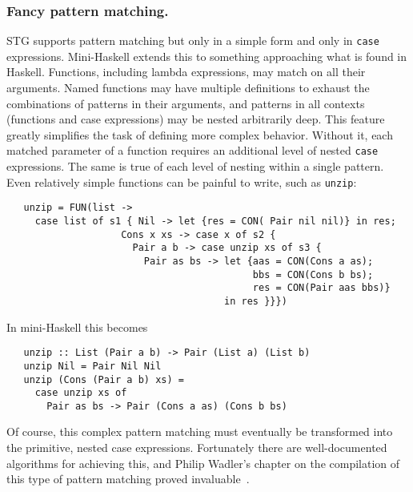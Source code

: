 \documentclass{llncs}
\begin{document}
\subsubsection{Fancy pattern matching.}

STG supports pattern matching but only in a simple form and only in
\texttt{case} expressions.  Mini-Haskell extends this to something approaching
what is found in Haskell.  Functions, including lambda expressions, may match on
all their arguments. Named functions may have multiple definitions to exhaust
the combinations of patterns in their arguments, and patterns in all contexts
(functions and case expressions) may be nested arbitrarily deep.  This feature
greatly simplifies the task of defining more complex behavior.  Without it,
each matched parameter of a function requires an additional level of nested
\texttt{case} expressions. The same is true of each level of nesting within a
single pattern.
%
Even relatively simple functions can be painful to write, such as \texttt{unzip}:
{\footnotesize
\begin{verbatim}
   unzip = FUN(list -> 
     case list of s1 { Nil -> let {res = CON( Pair nil nil)} in res;
                    Cons x xs -> case x of s2 {
                      Pair a b -> case unzip xs of s3 {
                        Pair as bs -> let {aas = CON(Cons a as);
                                           bbs = CON(Cons b bs);
                                           res = CON(Pair aas bbs)}
                                      in res }}})
\end{verbatim}}
\noindent In mini-Haskell this becomes
{\footnotesize
\begin{verbatim}
   unzip :: List (Pair a b) -> Pair (List a) (List b)
   unzip Nil = Pair Nil Nil
   unzip (Cons (Pair a b) xs) =
     case unzip xs of
       Pair as bs -> Pair (Cons a as) (Cons b bs)
\end{verbatim}}

Of course, this complex pattern matching must eventually be transformed into
the primitive, nested case expressions. Fortunately there are well-documented
algorithms for achieving this, and Philip Wadler's chapter
on the compilation of this type of pattern matching proved
invaluable~\cite{Jones:1987}.

\begin{comment} Trimming Mini-Haskell to fit page limit
Wadler describes the \emph{match} function
which, in its simplest form, produces a correct, but potentially large
translation with some redundancy.  This function was implemented with only
minor modifications to fit the shape of mini-Haskell's abstract form.  The
implementation is augmented by some light flow-analysis to eliminate some of
the redundancy and make the resulting code easier to read.  There are further
optimizations suggested by Wadler to address the size of the generated code,
for example, when multiple branches lead to the same large expression, but the
additional complexity outweighs the benefit for a testing language.
\end{comment}
\end{document}

